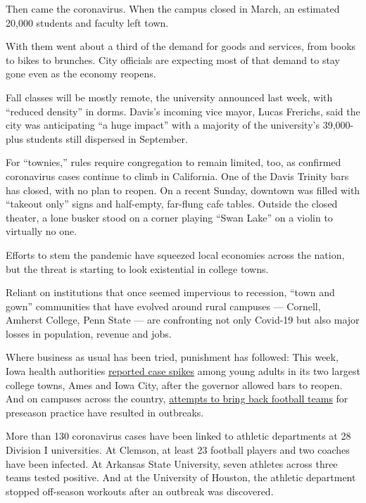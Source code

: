 Then came the coronavirus. When the campus closed in March, an estimated
20,000 students and faculty left town.

With them went about a third of the demand for goods and services, from
books to bikes to brunches. City officials are expecting most of that
demand to stay gone even as the economy reopens.

Fall classes will be mostly remote, the university announced last week,
with ``reduced density'' in dorms. Davis's incoming vice mayor, Lucas
Frerichs, said the city was anticipating ``a huge impact'' with a
majority of the university's 39,000-plus students still dispersed in
September.

For ``townies,'' rules require congregation to remain limited, too, as
confirmed coronavirus cases continue to climb in California. One of the
Davis Trinity bars has closed, with no plan to reopen. On a recent
Sunday, downtown was filled with ``takeout only'' signs and half-empty,
far-flung cafe tables. Outside the closed theater, a lone busker stood
on a corner playing ``Swan Lake'' on a violin to virtually no one.

Efforts to stem the pandemic have squeezed local economies across the
nation, but the threat is starting to look existential in college towns.

Reliant on institutions that once seemed impervious to recession, ``town
and gown'' communities that have evolved around rural campuses ---
Cornell, Amherst College, Penn State --- are confronting not only
Covid-19 but also major losses in population, revenue and jobs.

Where business as usual has been tried, punishment has followed: This
week, Iowa health authorities
\href{https://ktiv.com/2020/06/23/virus-cases-spike-among-young-adults-in-iowa-college-towns-2/}{reported
case spikes} among young adults in its two largest college towns, Ames
and Iowa City, after the governor allowed bars to reopen. And on
campuses across the country,
\href{https://www.nytimes3xbfgragh.onion/2020/06/25/sports/ncaafootball/college-football-coronavirus-cases.html?action=click\&module=Top\%20Stories\&pgtype=Homepage}{attempts
to bring back football teams} for preseason practice have resulted in
outbreaks.

More than 130 coronavirus cases have been linked to athletic departments
at 28 Division I universities. At Clemson, at least 23 football players
and two coaches have been infected. At Arkansas State University, seven
athletes across three teams tested positive. And at the University of
Houston, the athletic department stopped off-season workouts after an
outbreak was discovered.

